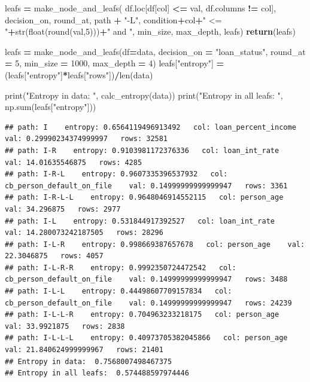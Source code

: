\documentclass[
]{book}
\newenvironment{Shaded}{\begin{snugshade}}{\end{snugshade}}
\newcommand{\BuiltInTok}[1]{#1}
\newcommand{\ControlFlowTok}[1]{\textcolor[rgb]{0.13,0.29,0.53}{\textbf{#1}}}
\newcommand{\DecValTok}[1]{\textcolor[rgb]{0.00,0.00,0.81}{#1}}
\newcommand{\NormalTok}[1]{#1}
\newcommand{\OperatorTok}[1]{\textcolor[rgb]{0.81,0.36,0.00}{\textbf{#1}}}
\newcommand{\StringTok}[1]{\textcolor[rgb]{0.31,0.60,0.02}{#1}}
\begin{document}
\begin{Shaded}
\begin{Highlighting}[]
\NormalTok{    leafs }\OperatorTok{=}\NormalTok{ make\_node\_and\_leafs( df.loc[df[col] }\OperatorTok{\textless{}=}\NormalTok{ val, df.columns }\OperatorTok{!=}\NormalTok{ col], decision\_on, round\_at, path }\OperatorTok{+} \StringTok{"{-}L"}\NormalTok{, condition}\OperatorTok{+}\NormalTok{col}\OperatorTok{+}\StringTok{" \textless{}= "}\OperatorTok{+}\BuiltInTok{str}\NormalTok{(}\BuiltInTok{float}\NormalTok{(}\BuiltInTok{round}\NormalTok{(val,}\DecValTok{5}\NormalTok{)))}\OperatorTok{+}\StringTok{" and "}\NormalTok{, min\_size, max\_depth, leafs)}
  \ControlFlowTok{return}\NormalTok{(leafs)}

\NormalTok{leafs }\OperatorTok{=}\NormalTok{ make\_node\_and\_leafs(df}\OperatorTok{=}\NormalTok{data, decision\_on }\OperatorTok{=} \StringTok{"loan\_status"}\NormalTok{, round\_at }\OperatorTok{=} \DecValTok{5}\NormalTok{, min\_size }\OperatorTok{=} \DecValTok{1000}\NormalTok{, max\_depth }\OperatorTok{=} \DecValTok{4}\NormalTok{)}
\NormalTok{leafs[}\StringTok{"entropy"}\NormalTok{] }\OperatorTok{=}\NormalTok{ (leafs[}\StringTok{"entropy"}\NormalTok{]}\OperatorTok{*}\NormalTok{leafs[}\StringTok{"rows"}\NormalTok{])}\OperatorTok{/}\BuiltInTok{len}\NormalTok{(data)}

\BuiltInTok{print}\NormalTok{(}\StringTok{"Entropy in data: "}\NormalTok{, calc\_entropy(data))}
\BuiltInTok{print}\NormalTok{(}\StringTok{"Entropy in all leafs: "}\NormalTok{, np.}\BuiltInTok{sum}\NormalTok{(leafs[}\StringTok{"entropy"}\NormalTok{]))}
\end{Highlighting}
\end{Shaded}

\begin{verbatim}
## path: I    entropy: 0.6564119496913492   col: loan_percent_income    val: 0.29990234374999997   rows: 32581
## path: I-R    entropy: 0.9103981172376336   col: loan_int_rate    val: 14.01635546875   rows: 4285
## path: I-R-L    entropy: 0.9607335396537932   col: cb_person_default_on_file    val: 0.14999999999999947   rows: 3361
## path: I-R-L-L    entropy: 0.9648046914552115   col: person_age    val: 34.296875   rows: 2977
## path: I-L    entropy: 0.531844917392527   col: loan_int_rate    val: 14.280073242187505   rows: 28296
## path: I-L-R    entropy: 0.998669387657678   col: person_age    val: 22.3046875   rows: 4057
## path: I-L-R-R    entropy: 0.9992350724472542   col: cb_person_default_on_file    val: 0.14999999999999947   rows: 3488
## path: I-L-L    entropy: 0.44498607709157834   col: cb_person_default_on_file    val: 0.14999999999999947   rows: 24239
## path: I-L-L-R    entropy: 0.704963233218175   col: person_age    val: 33.9921875   rows: 2838
## path: I-L-L-L    entropy: 0.40973705382045866   col: person_age    val: 21.840624999999967   rows: 21401
## Entropy in data:  0.7568007498467375
## Entropy in all leafs:  0.574488597974446
\end{verbatim}
\end{document}
